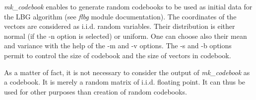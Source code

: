 {\em mk\_codebook} enables to generate random codebooks to be used as initial 
data for the LBG algorithm (see {\em flbg} module documentation). The 
coordinates of the vectors are considered as i.i.d. random variables. 
Their distribution is either normal (if the -n option is selected) 
or uniform. One can choose also their mean and variance with the help 
of the -m and -v options. The -s and -b options permit to control 
the size of codebook and the size of vectors in codebook. 

As a matter of fact, it is not necessary to consider the output 
of {\em mk\_codebook} as a codebook. It is merely a random matrix 
of i.i.d. floating point. It can thus be used for other purposes 
than creation of random codebooks.  
